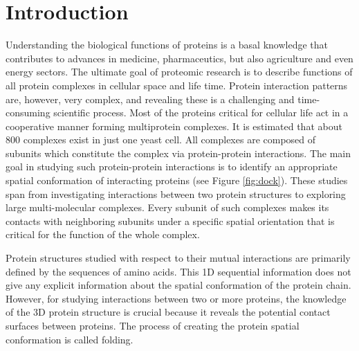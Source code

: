 \documentclass[11pt,a4paper,titlepage,oneside,onecolumn]{article}
\begin{document}
\section{Introduction}
\label{sec:Introduction}
Understanding the biological functions of proteins is a basal knowledge that contributes to advances in medicine, pharmaceutics, but also agriculture and even energy sectors. 
The ultimate goal of proteomic research is to describe functions of all protein complexes in cellular space and life time. 
Protein interaction patterns are, however, very complex, and revealing these is a challenging and time-consuming scientific process. 
Most of the proteins critical for cellular life act in a cooperative manner forming multiprotein complexes. 
It is estimated that about 800 complexes exist in just one yeast cell.
All complexes are composed of subunits which constitute the complex via protein-protein interactions.
The main goal in studying such protein-protein interactions is to identify an appropriate spatial conformation of interacting proteins (see Figure \ref{fig:dock}). 
These studies span from investigating interactions between two protein structures to exploring large multi-molecular complexes.
Every subunit of such complexes makes its contacts with neighboring subunits under a specific spatial orientation that is critical for the function of the whole complex.


Protein structures studied with respect to their mutual interactions are primarily defined by the sequences of amino acids. 
This 1D sequential information does not give any explicit information about the spatial conformation of the protein chain.
However, for studying interactions between two or more proteins, the knowledge of the 3D protein structure is crucial because it reveals the potential contact surfaces between proteins.
The process of creating the protein spatial conformation is called folding.%
\end{document}

